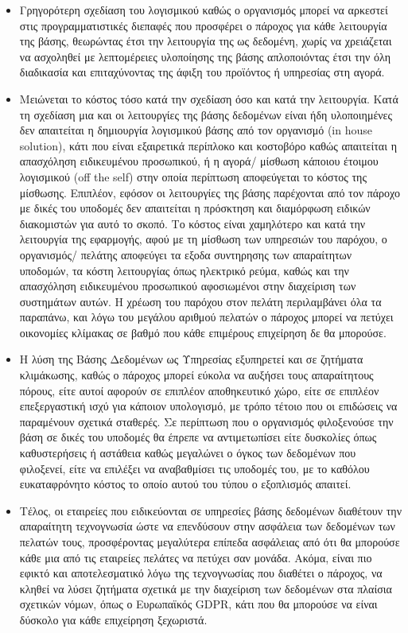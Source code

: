\documentclass{article}
\begin{document}
\begin{itemize}
\item Γρηγορότερη σχεδίαση του λογισμικού καθώς ο οργανισμός μπορεί να αρκεστεί στις προγραμματιστικές διεπαφές που προσφέρει ο πάροχος για κάθε λειτουργία της βάσης, θεωρώντας έτσι την λειτουργία της ως δεδομένη, χωρίς να χρειάζεται να ασχοληθεί με λεπτομέρειες υλοποίησης της βάσης απλοποιόντας έτσι την όλη διαδικασία και επιταχύνοντας της άφιξη του προϊόντος ή υπηρεσίας στη αγορά.
\item Μειώνεται το κόστος τόσο κατά την σχεδίαση όσο και κατά την λειτουργία. Κατά τη σχεδίαση μια και οι λειτουργίες της βάσης δεδομένων είναι ήδη υλοποιημένες δεν απαιτείται η δημιουργία λογισμικού βάσης από τον οργανισμό (in house solution), κάτι που είναι εξαιρετικά περίπλοκο και κοστοβόρο καθώς απαιτείται η απασχόληση ειδικευμένου προσωπικού, ή η αγορά/ μίσθωση κάποιου έτοιμου λογισμικού (off the self) στην οποία περίπτωση αποφεύγεται το κόστος της μίσθωσης. Επιπλέον, εφόσον οι λειτουργίες της βάσης παρέχονται από τον πάροχο με δικές του υποδομές δεν απαιτείται η πρόσκτηση και διαμόρφωση ειδικών διακομιστών για αυτό το σκοπό. Το κόστος είναι χαμηλότερο και κατά την λειτουργία της εφαρμογής, αφού με τη μίσθωση των υπηρεσιών του παρόχου, ο οργανισμός/ πελάτης αποφεύγει τα εξοδα συντηρησης των απαραίτητων υποδομών, τα κόστη λειτουργίας όπως ηλεκτρικό ρεύμα, καθώς και την απασχόληση ειδικευμένου προσωπικού αφοσιωμένοι στην διαχείριση των συστημάτων αυτών. Η χρέωση του παρόχου στον πελάτη περιλαμβάνει όλα τα παραπάνω, και λόγω του μεγάλου αριθμού πελατών ο πάροχος μπορεί να πετύχει οικονομίες κλίμακας σε βαθμό που κάθε επιμέρους επιχείρηση δε θα μπορούσε.
\item Η λύση της Βάσης Δεδομένων ως Υπηρεσίας εξυπηρετεί και σε ζητήματα κλιμάκωσης, καθώς ο πάροχος μπορεί εύκολα να αυξήσει τους απαραίτητους πόρους, είτε αυτοί αφορούν σε επιπλέον αποθηκευτικό χώρο, είτε σε επιπλέον επεξεργαστική ισχύ για κάποιον υπολογισμό, με τρόπο τέτοιο που οι επιδώσεις να παραμένουν σχετικά σταθερές. Σε περίπτωση που ο οργανισμός φιλοξενούσε την βάση σε δικές του υποδομές θα έπρεπε να αντιμετωπίσει είτε δυσκολίες όπως καθυστερήσεις ή αστάθεια καθώς μεγαλώνει ο όγκος των δεδομένων που φιλοξενεί, είτε να επιλέξει να αναβαθμίσει τις υποδομές του, με το καθόλου ευκαταφρόνητο κόστος το οποίο αυτού του τύπου ο εξοπλισμός απαιτεί.
\item Τέλος, οι εταιρείες που ειδικεύονται σε υπηρεσίες βάσης δεδομένων διαθέτουν την απαραίτητη τεχνογνωσία ώστε να επενδύσουν στην ασφάλεια των δεδομένων των πελατών τους, προσφέροντας μεγαλύτερα επίπεδα ασφάλειας από ότι θα μπορούσε κάθε μια από τις εταιρείες πελάτες να πετύχει σαν μονάδα. Ακόμα, είναι πιο εφικτό και αποτελεσματικό λόγω της τεχνογνωσίας που διαθέτει ο πάροχος, να κληθεί να λύσει ζητήματα σχετικά με την διαχείριση των δεδομένων στα πλαίσια σχετικών νόμων, όπως ο Ευρωπαϊκός GDPR, κάτι που θα μπορούσε να είναι δύσκολο για κάθε επιχείρηση ξεχωριστά.
\end{itemize}
\end{document}
